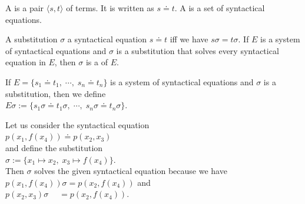 \begin{Definition} 
  A   is a pair $\langle s, t \rangle$ of terms.
  It is written as $s \doteq t$. 
  A   is a set of syntactical
  equations.
  \eox
\end{Definition}


\begin{Definition}[Unifier]
  A substitution $\sigma$  a syntactical equation $s \doteq t$ iff we have $s\sigma = t\sigma$.
  If $E$ is a system of syntactical equations and $\sigma$ is a substitution that solves
  every syntactical equation in $E$, then $\sigma$ is a    of $E$.
  \eox
\end{Definition}

\noindent
If $E = \{ s_1 \doteq t_1,\; \cdots,\; s_n \doteq t_n \}$ is a system of syntactical equations and $\sigma$ is a
substitution, then we define
\\[0.2cm]
\hspace*{1.3cm}  $E\sigma := \{ s_1\sigma \doteq t_1\sigma,\; \cdots,\; s_n\sigma \doteq t_n\sigma \}$.
\vspace{0.3cm}

\exampleEng
Let us consider the syntactical equation
\\[0.2cm]
\hspace*{1.3cm}
$p(x_1, f(x_4)) \doteq p( x_2, x_3)$
\\[0.2cm]
and define the substitution
\\[0.2cm]
\hspace*{1.3cm}
$\sigma := \{ x_1 \mapsto x_2,\; x_3 \mapsto f(x_4) \}$.
\\[0.2cm]
Then $\sigma$ solves the given syntactical equation because we have
\\[0.2cm]
\hspace*{1.3cm}
$p(x_1, f(x_4))\sigma = p(x_2, f(x_4))$ \quad and \quad \\[0.2cm]
\hspace*{1.3cm}
$p(x_2, x_3)\sigma \;\quad = p(x_2, f(x_4))$.  \eox

